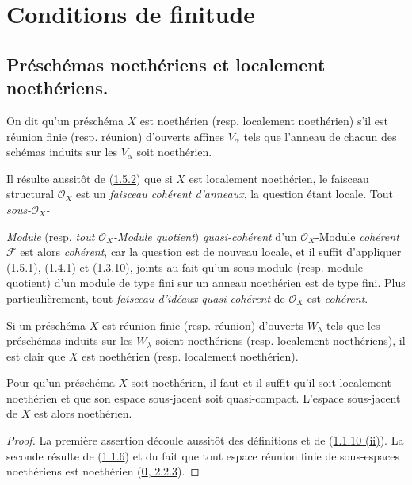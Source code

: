 \section{Conditions de finitude}
\label{section:I.6-fr}

\subsection{Préschémas noethériens et localement noethériens.}
\label{subsection:I.6.1-fr}

\begin{definition}[6.1.1]
\label{I.6.1.1-fr}
On dit qu'un préschéma $X$ est noethérien \textup{(resp.} localement
noethérien) s'il est réunion finie \textup{(resp.} réunion) d'ouverts affines
$V_\alpha$ tels que l'anneau de chacun des schémas induits sur les $V_\alpha$
soit noethérien.
\end{definition}

Il résulte aussitôt de (\hyperref[I.1.5.2-fr]{1.5.2}) que si $X$ est
localement noethérien, le faisceau structural $\mathscr{O}_X$ est un
\emph{faisceau cohérent d'anneaux}, la question étant locale. Tout
\emph{sous-$\mathscr{O}_X$-}

\emph{Module} (resp. \emph{tout $\mathscr{O}_X$-Module quotient}) \emph{quasi-cohérent}
d'un $\mathscr{O}_X$-Module \emph{cohérent} $\mathscr{F}$ est alors
\emph{cohérent}, car la question est de nouveau locale, et il suffit
d'appliquer (\hyperref[I.1.5.1-fr]{1.5.1}),
(\hyperref[I.1.4.1-fr]{1.4.1}) et
(\hyperref[I.1.3.10-fr]{1.3.10}), joints au fait qu'un sous-module (resp.
module quotient) d'un module de type fini sur un anneau noethérien est de
type fini. Plus particulièrement, tout \emph{faisceau d'idéaux
quasi-cohérent} de $\mathscr{O}_X$ est \emph{cohérent}.

Si un préschéma $X$ est réunion finie (resp. réunion) d'ouverts $W_\lambda$
tels que les préschémas induits sur les $W_\lambda$ soient noethériens (resp.
localement noethériens), il est clair que $X$ est noethérien (resp.
localement noethérien).

\begin{proposition}[6.1.2]
\label{I.6.1.2-fr}
Pour qu'un préschéma $X$ soit noethérien, il faut et il suffit qu'il soit
localement noethérien et que son espace sous-jacent soit quasi-compact.
L'espace sous-jacent de $X$ est alors noethérien.
\end{proposition}

\begin{proof}
La première assertion découle aussitôt des définitions et de
(\hyperref[I.1.1.10-fr]{1.1.10 (ii)}). La seconde résulte de
(\hyperref[I.1.1.6-fr]{1.1.6}) et du fait que tout espace réunion finie de
sous-espaces noethériens est noethérien
(\hyperref[0.2.2.3-fr]{\textbf{0}, 2.2.3}).
\end{proof}

